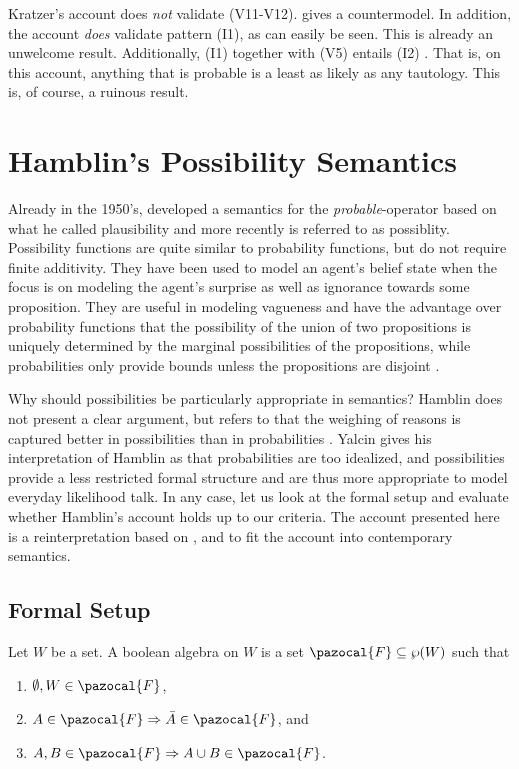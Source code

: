 \documentclass{article}
\theoremstyle{definition}
\newcommand{\F}{\pazocal{F}}
\begin{document}
Kratzer's account does \emph{not} validate (V11-V12).
\textcite[pp.~935, note~8]{yalcin10_probab_operat} gives a countermodel. In addition, the account \emph{does} validate pattern (I1), as can easily be seen. This is already an unwelcome result. Additionally, (I1) together with (V5) entails (I2) \parencite[p.~922]{yalcin10_probab_operat}. That is, on this account, anything that is probable is a least as likely as any tautology. This is, of course, a ruinous result.

\section{Hamblin's Possibility Semantics}
Already in the 1950's, \textcite{hamblin59_modal_probab} developed a semantics for the \emph{probable}-operator based on what he called plausibility and more recently is referred to as possiblity. Possibility functions are quite similar to probability functions, but do not require finite additivity. They have been used to model an agent's belief state when the focus is on modeling the agent's surprise as well as ignorance towards some proposition. They are useful in modeling vagueness and have the advantage over probability functions that the possibility of the union of two propositions is uniquely determined by the marginal possibilities of the propositions, while probabilities only provide bounds unless the propositions are disjoint \parencite[][p.~45]{halpern03_reason_about_uncer}.

Why should possibilities be particularly appropriate in semantics? Hamblin does not present a clear argument, but refers to that the weighing of reasons is captured better in possibilities than in probabilities \parencite[][p.~240]{hamblin59_modal_probab}.
Yalcin gives his interpretation of Hamblin as that probabilities are too idealized, and possibilities provide a less restricted formal structure and are thus more appropriate to model everyday likelihood talk.
In any case, let us look at the formal setup and evaluate whether Hamblin's account holds up to our criteria. 
The account presented here is a reinterpretation based on \textcite{hamblin59_modal_probab}, \textcite[][pp.~42]{halpern03_reason_about_uncer} and \textcite{yalcin10_probab_operat} to fit the account into contemporary semantics.

\subsection{Formal Setup}
\noindent Let $W$ be a set. A boolean algebra on $W$ is a set $\F \subseteq \wp(W)$ such that
\begin{enumerate}[nosep]
  \item $\emptyset, W \in \F$,
  \item $A \in \F \Rightarrow \bar{A} \in \F$, and
  \item $A,B \in \F \Rightarrow A \cup B \in \F$.
\end{enumerate}
\end{document}
